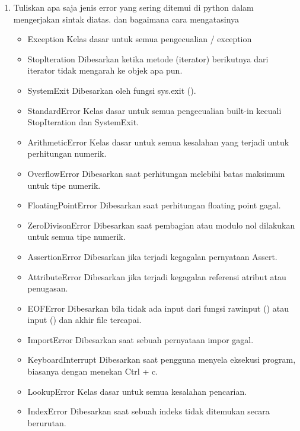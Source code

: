\begin{enumerate}
\item Tuliskan apa saja jenis error yang sering ditemui di python dalam mengerjakan
sintak diatas. dan bagaimana cara mengatasinya
\begin{itemize}
\item Exception
Kelas dasar untuk semua pengecualian / exception

\item Stoplteration
Dibesarkan ketika metode (iterator) berikutnya dari iterator tidak mengarah ke objek apa pun.

\item SystemExit
Dibesarkan oleh fungsi sys.exit ().

\item StandardError
Kelas dasar untuk semua pengecualian built-in kecuali StopIteration dan SystemExit.

\item ArithmeticError
Kelas dasar untuk semua kesalahan yang terjadi untuk perhitungan numerik.

\item OverflowError
Dibesarkan saat perhitungan melebihi batas maksimum untuk tipe numerik.

\item FloatingPointError
Dibesarkan saat perhitungan floating point gagal.

\item ZeroDivisonError
Dibesarkan saat pembagian atau modulo nol dilakukan untuk semua tipe numerik.

\item AssertionError
Dibesarkan jika terjadi kegagalan pernyataan Assert.

\item AttributeError
Dibesarkan jika terjadi kegagalan referensi atribut atau penugasan.
\item EOFError
Dibesarkan bila tidak ada input dari fungsi rawinput () atau input () dan akhir file tercapai.

\item ImportError
Dibesarkan saat sebuah pernyataan impor gagal.

\item KeyboardInterrupt
Dibesarkan saat pengguna menyela eksekusi program, biasanya dengan menekan Ctrl + c.

\item LookupError
Kelas dasar untuk semua kesalahan pencarian.

\item IndexError
Dibesarkan saat sebuah indeks tidak ditemukan secara berurutan.


\end{itemize}
\end{enumerate}
